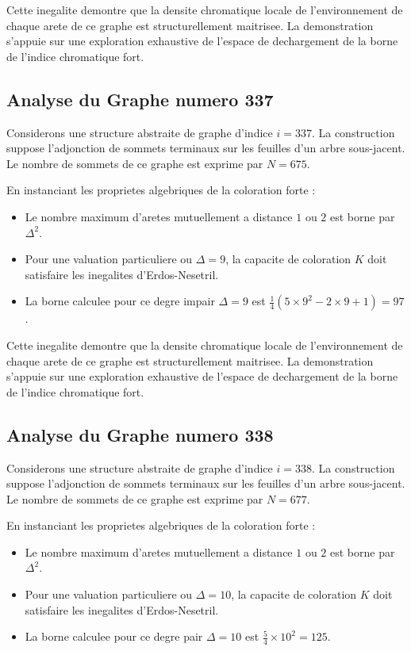 \documentclass[11pt,a4paper]{article}
\begin{document}
Cette inegalite demontre que la densite chromatique locale de l'environnement de chaque arete de ce graphe est structurellement maitrisee. La demonstration s'appuie sur une exploration exhaustive de l'espace de dechargement de la borne de l'indice chromatique fort.

\subsection{Analyse du Graphe numero 337}
Considerons une structure abstraite de graphe d'indice $i = 337$. La construction suppose l'adjonction de sommets terminaux sur les feuilles d'un arbre sous-jacent. Le nombre de sommets de ce graphe est exprime par $N = 675$.

En instanciant les proprietes algebriques de la coloration forte :
\begin{itemize}
\item Le nombre maximum d'aretes mutuellement a distance $1$ ou $2$ est borne par $\Delta^2$.
\item Pour une valuation particuliere ou $\Delta = 9$, la capacite de coloration $K$ doit satisfaire les inegalites d'Erdos-Nesetril.
\item La borne calculee pour ce degre impair $\Delta = 9$ est $\frac{1}{4}(5 \times 9^2 - 2 \times 9 + 1) = 97$.
\end{itemize}

Cette inegalite demontre que la densite chromatique locale de l'environnement de chaque arete de ce graphe est structurellement maitrisee. La demonstration s'appuie sur une exploration exhaustive de l'espace de dechargement de la borne de l'indice chromatique fort.

\subsection{Analyse du Graphe numero 338}
Considerons une structure abstraite de graphe d'indice $i = 338$. La construction suppose l'adjonction de sommets terminaux sur les feuilles d'un arbre sous-jacent. Le nombre de sommets de ce graphe est exprime par $N = 677$.

En instanciant les proprietes algebriques de la coloration forte :
\begin{itemize}
\item Le nombre maximum d'aretes mutuellement a distance $1$ ou $2$ est borne par $\Delta^2$.
\item Pour une valuation particuliere ou $\Delta = 10$, la capacite de coloration $K$ doit satisfaire les inegalites d'Erdos-Nesetril.
\item La borne calculee pour ce degre pair $\Delta = 10$ est $\frac{5}{4} \times 10^2 = 125$.
\end{itemize}
\end{document}

